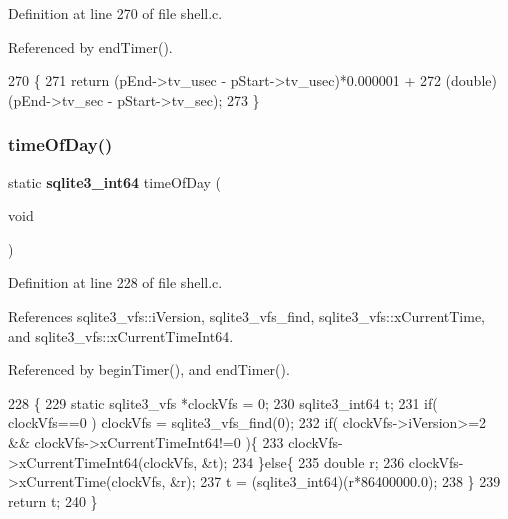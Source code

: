 Definition at line 270 of file shell.\+c.



Referenced by end\+Timer().


\begin{DoxyCode}
270                                                                     \{
271   \textcolor{keywordflow}{return} (pEnd->tv\_usec - pStart->tv\_usec)*0.000001 +
272          (double)(pEnd->tv\_sec - pStart->tv\_sec);
273 \}
\end{DoxyCode}
\mbox{\label{shell_8c_afac1717bd07a36ea4500b65db1afa30d}} 
\subsubsection{time\+Of\+Day()}
{\footnotesize\ttfamily static \textbf{ sqlite3\+\_\+int64} time\+Of\+Day (\begin{DoxyParamCaption}\item[{void}]{ }\end{DoxyParamCaption})\hspace{0.3cm}{\ttfamily [static]}}



Definition at line 228 of file shell.\+c.



References sqlite3\+\_\+vfs\+::i\+Version, sqlite3\+\_\+vfs\+\_\+find, sqlite3\+\_\+vfs\+::x\+Current\+Time, and sqlite3\+\_\+vfs\+::x\+Current\+Time\+Int64.



Referenced by begin\+Timer(), and end\+Timer().


\begin{DoxyCode}
228                                     \{
229   \textcolor{keyword}{static} sqlite3_vfs *clockVfs = 0;
230   sqlite3_int64 t;
231   \textcolor{keywordflow}{if}( clockVfs==0 ) clockVfs = sqlite3_vfs_find(0);
232   \textcolor{keywordflow}{if}( clockVfs->iVersion>=2 && clockVfs->xCurrentTimeInt64!=0 )\{
233     clockVfs->xCurrentTimeInt64(clockVfs, &t);
234   \}\textcolor{keywordflow}{else}\{
235     \textcolor{keywordtype}{double} r;
236     clockVfs->xCurrentTime(clockVfs, &r);
237     t = (sqlite3_int64)(r*86400000.0);
238   \}
239   \textcolor{keywordflow}{return} t;
240 \}
\end{DoxyCode}
\mbox{\label{shell_8c_a86ee25abe4a10448e63d8cdf253ee77f}} 
